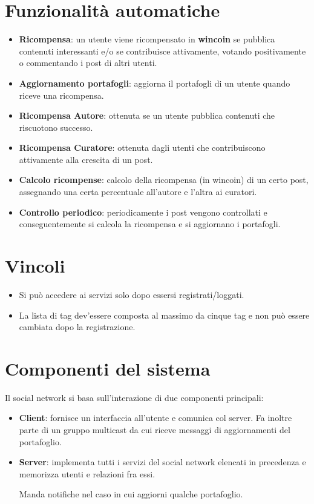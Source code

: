 \section{Funzionalit\`a automatiche}
\begin{itemize}
	\item \textbf{Ricompensa}: un utente viene ricompensato in \textbf{wincoin} se pubblica contenuti interessanti e/o se
	      contribuisce attivamente, votando positivamente o commentando i post di altri utenti.
	\item \textbf{Aggiornamento portafogli}: aggiorna il portafogli di un utente quando riceve una ricompensa.
	\item \textbf{Ricompensa Autore}: ottenuta se un utente pubblica contenuti che riscuotono successo.
	\item \textbf{Ricompensa Curatore}: ottenuta dagli utenti che contribuiscono attivamente alla crescita di un post.
	\item \textbf{Calcolo ricompense}: calcolo della ricompensa (in wincoin) di un certo post, assegnando una
	      certa percentuale all'autore e l'altra ai curatori.
	\item \textbf{Controllo periodico}: periodicamente i post vengono controllati e conseguentemente si calcola la ricompensa
	      e si aggiornano i portafogli.
\end{itemize}

\section{Vincoli}
\begin{itemize}
	\item Si pu\`o accedere ai servizi solo dopo essersi registrati/loggati.
	\item La lista di tag dev'essere composta al massimo da cinque tag e non pu\`o essere cambiata dopo la registrazione.
\end{itemize}

\section{Componenti del sistema}
Il social network si basa sull'interazione di due componenti principali:
\begin{itemize}
	\item \textbf{Client}: fornisce un interfaccia all'utente e comunica col server. Fa inoltre parte di un gruppo
	      multicast da cui riceve messaggi di aggiornamenti del portafoglio.
	\item \textbf{Server}: implementa tutti i servizi del social network elencati in precedenza e memorizza utenti e
	      relazioni fra essi.

	      Manda notifiche nel caso in cui aggiorni qualche portafoglio.
\end{itemize}